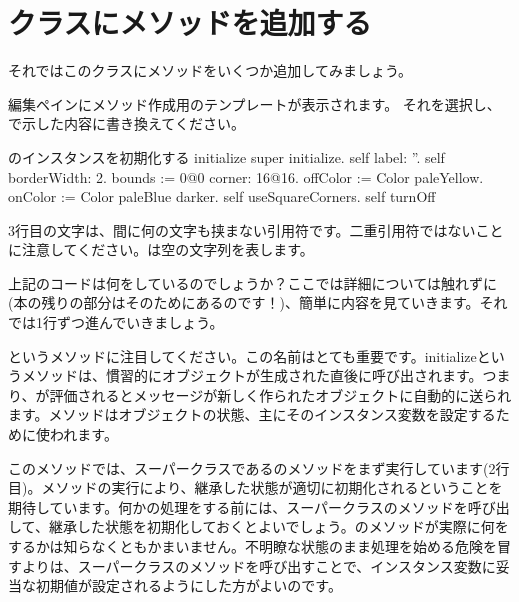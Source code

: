\documentclass[a4paper,10pt,twoside]{book}
\begin{document}
\section{クラスにメソッドを追加する}

それではこのクラスにメソッドをいくつか追加してみましょう。


編集ペインにメソッド作成用のテンプレートが表示されます。
それを選択し、で示した内容に書き換えてください。


\begin{numMethod}[scbecellinitialize]{のインスタンスを初期化する}
initialize
   super initialize.
   self label: ''.
   self borderWidth: 2.
   bounds := 0@0 corner: 16@16.
   offColor := Color paleYellow.
   onColor := Color paleBlue darker.
   self useSquareCorners.
   self turnOff
\end{numMethod}

\noindent
3行目の文字は、間に何の文字も挟まない引用符です。二重引用符ではないことに注意してください。は空の文字列を表します。


上記のコードは何をしているのでしょうか？ここでは詳細については触れずに(本の残りの部分はそのためにあるのです！)、簡単に内容を見ていきます。それでは1行ずつ進んでいきましょう。

というメソッドに注目してください。この名前はとても重要です。initializeというメソッドは、慣習的にオブジェクトが生成された直後に呼び出されます。つまり、が評価されるとメッセージが新しく作られたオブジェクトに自動的に送られます。メソッドはオブジェクトの状態、主にそのインスタンス変数を設定するために使われます。

このメソッドでは、スーパークラスであるのメソッドをまず実行しています(2行目)。メソッドの実行により、継承した状態が適切に初期化されるということを期待しています。何かの処理をする前には、スーパークラスのメソッドを呼び出して、継承した状態を初期化しておくとよいでしょう。のメソッドが実際に何をするかは知らなくともかまいません。不明瞭な状態のまま処理を始める危険を冒すよりは、スーパークラスのメソッドを呼び出すことで、インスタンス変数に妥当な初期値が設定されるようにした方がよいのです。
\end{document}
